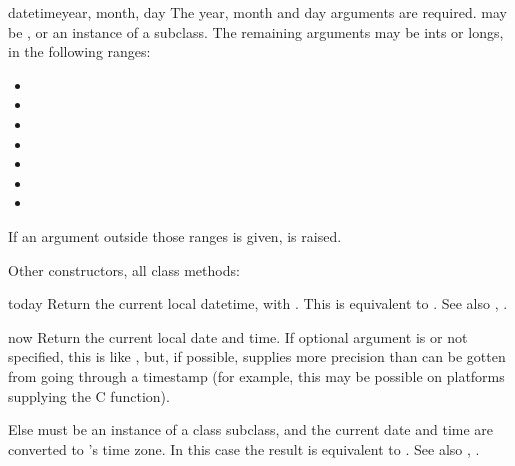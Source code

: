 \begin{classdesc}{datetime}{year, month, day}
  The year, month and day arguments are required.   may
  be , or an instance of a  subclass.  The
  remaining arguments may be ints or longs, in the following ranges:

  \begin{itemize}
    \item {}
    \item {}
    \item {}
    \item {}
    \item {}
    \item {}
    \item {}
  \end{itemize}

  If an argument outside those ranges is given,
   is raised.
\end{classdesc}

Other constructors, all class methods:

\begin{methoddesc}{today}{}
  Return the current local datetime, with  .
  This is equivalent to
  .
  See also , .
\end{methoddesc}

\begin{methoddesc}{now}{}
  Return the current local date and time.  If optional argument
   is  or not specified, this is like
  , but, if possible, supplies more precision than can
  be gotten from going through a  timestamp (for
  example, this may be possible on platforms supplying the C
   function).

  Else  must be an instance of a class  subclass,
  and the current date and time are converted to 's time
  zone.  In this case the result is equivalent to
  .
  See also , .
\end{methoddesc}

